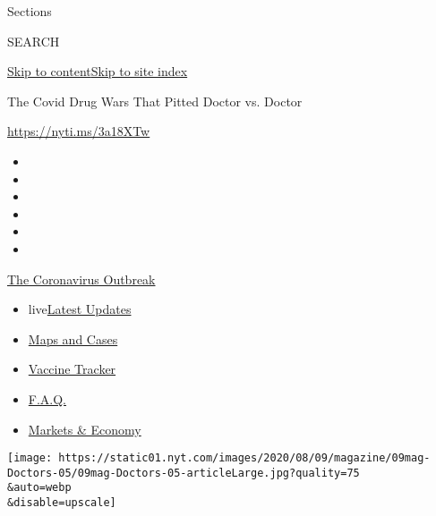 Sections

SEARCH

\protect\hyperlink{site-content}{Skip to
content}\protect\hyperlink{site-index}{Skip to site index}

The Covid Drug Wars That Pitted Doctor vs. Doctor

\href{https://nyti.ms/3a18XTw}{https://nyti.ms/3a18XTw}

\begin{itemize}
\item
\item
\item
\item
\item
\item
\end{itemize}

\href{https://www.nytimes.com/news-event/coronavirus?action=click\&pgtype=Article\&state=default\&region=TOP_BANNER\&context=storylines_menu}{The
Coronavirus Outbreak}

\begin{itemize}
\tightlist
\item
  live\href{https://www.nytimes.com/2020/08/08/world/coronavirus-updates.html?action=click\&pgtype=Article\&state=default\&region=TOP_BANNER\&context=storylines_menu}{Latest
  Updates}
\item
  \href{https://www.nytimes.com/interactive/2020/us/coronavirus-us-cases.html?action=click\&pgtype=Article\&state=default\&region=TOP_BANNER\&context=storylines_menu}{Maps
  and Cases}
\item
  \href{https://www.nytimes.com/interactive/2020/science/coronavirus-vaccine-tracker.html?action=click\&pgtype=Article\&state=default\&region=TOP_BANNER\&context=storylines_menu}{Vaccine
  Tracker}
\item
  \href{https://www.nytimes.com/interactive/2020/world/coronavirus-tips-advice.html?action=click\&pgtype=Article\&state=default\&region=TOP_BANNER\&context=storylines_menu}{F.A.Q.}
\item
  \href{https://www.nytimes.com/live/2020/08/07/business/stock-market-today-coronavirus?action=click\&pgtype=Article\&state=default\&region=TOP_BANNER\&context=storylines_menu}{Markets
  \& Economy}
\end{itemize}

\texttt{[image: https://static01.nyt.com/images/2020/08/09/magazine/09mag-Doctors-05/09mag-Doctors-05-articleLarge.jpg?quality=75\\\&auto=webp\\\&disable=upscale]}

